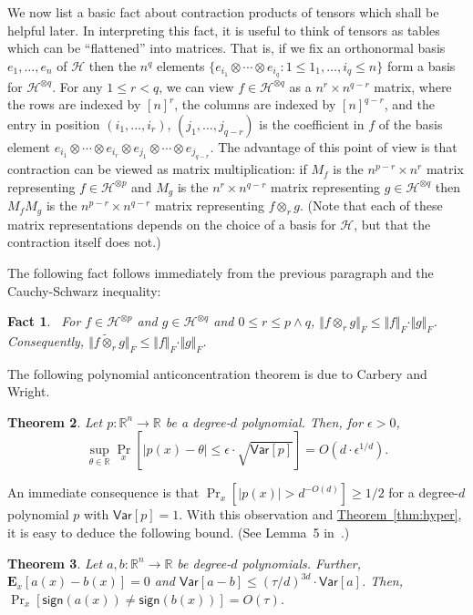 \documentclass[11pt]{article}
\numberwithin{equation}{section}
\newtheorem{theorem}{Theorem}[section]
\newtheorem{fact}[theorem]{Fact}
\theoremstyle{definition}
\theoremstyle{plain}
\newcommand{\expref}[2]{\hyperref[#2]{#1~\ref{#2}}}
\begin{document}
We now list a basic fact about contraction products of tensors which shall be
helpful later. In interpreting this fact, it is useful to think of tensors as
tables which can be ``flattened'' into matrices. That is, if we fix an
orthonormal basis $e_1, \dots, e_n$ of $\mathcal{H}$ then the $n^q$ elements
$\{e_{i_1} \otimes \cdots \otimes e_{i_q}: 1 \le 1_1, \dots, i_q \le n\}$ form
a basis for $\mathcal{H}^{\otimes q}$. For any $1 \le r < q$, we can view $f
\in \mathcal{H}^{\otimes q}$ as a $n^r \times n^{q-r}$ matrix, where the rows
are indexed by $[n]^r$, the columns are indexed by $[n]^{q-r}$, and the entry
in position $(i_1, \dots, i_r)$, $(j_1, \dots, j_{q-r})$ is the coefficient in
$f$ of the basis element $e_{i_1} \otimes \cdots \otimes e_{i_r} \otimes
e_{j_1} \otimes \cdots \otimes e_{j_{q-r}}$.  The advantage of this point of
view is that contraction can be viewed as matrix multiplication: if $M_f$ is
the $n^{p - r} \times n^r$ matrix representing $f \in \mathcal{H}^{\otimes p}$ and
$M_g$ is the $n^r \times n^{q-r}$ matrix representing $g \in \mathcal{H}^{\otimes
q}$ then $M_f M_g$ is the $n^{p - r} \times n^{q - r}$ matrix representing $f
\otimes_r g$.  (Note that each of these matrix representations depends on the
choice of a basis for $\mathcal{H}$, but that the contraction itself does not.)

The following fact follows immediately from the previous paragraph and the
Cauchy-Schwarz inequality:
\begin{fact}~\label{fact:contraction}
For $f \in \mathcal{H}^{\otimes p}$ and $g \in \mathcal{H}^{\otimes q}$ and $0 \le r \le p \wedge q$, $\Vert f \otimes_r g \Vert_F \le \Vert f \Vert_F \cdot \Vert g \Vert_F$. Consequently, $\Vert f \widetilde{\otimes}_r g \Vert_F \le \Vert f \Vert_F \cdot \Vert g \Vert_F$. 
\end{fact}

%
%
%
%
%
%
%

The following polynomial anticoncentration theorem is due to Carbery and Wright. 
\begin{theorem}\emph{\cite{CW:01}}\label{thm:CW}
Let $p: \mathbb{R}^n \rightarrow \mathbb{R}$ be a degree-$d$ polynomial.  Then, for $\epsilon>0$, 
$$
\sup_{\theta \in \mathbb{R}} \Pr_{x} [|p(x) -\theta| \le \epsilon \cdot \sqrt{\mathsf{Var}[p]}] = O(d \cdot \epsilon^{1/d}). 
$$
\end{theorem}
An immediate consequence is that $\Pr_{x} [|p(x)| > d^{-O(d)}] \ge {1}/{2}$ for a degree-$d$
polynomial $p$ with $\mathsf{Var}[p] = 1$. With this observation and \expref{Theorem}{thm:hyper},
it is easy to deduce the following bound. (See Lemma~5 in~\cite{DS14}.)
\begin{theorem}\label{thm:combine-hyper}
Let $a, b: \mathbb{R}^n \rightarrow \mathbb{R}$ be degree-$d$ polynomials. Further, $\mathbf{E}_x [a(x) - b(x)]=0$ and $\mathsf{Var}[a-b] \le (\tau/d)^{3d} \cdot \mathsf{Var}[a]$. Then, $\Pr_{x}[\mathsf{sign}(a(x)) \neq  \mathsf{sign}(b(x))] = O(\tau)$. 
\end{theorem}
\end{document}
